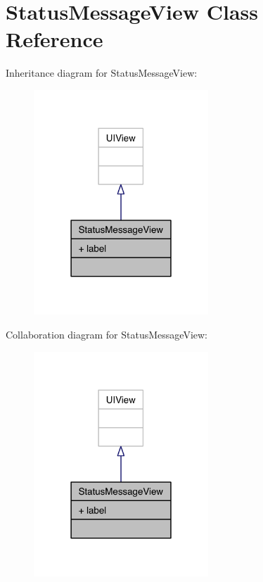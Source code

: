 \hypertarget{interface_status_message_view}{\section{Status\-Message\-View Class Reference}
\label{interface_status_message_view}
}


Inheritance diagram for Status\-Message\-View\-:\nopagebreak
\begin{figure}[H]
\begin{center}
\leavevmode
\includegraphics[width=186pt]{interface_status_message_view__inherit__graph}
\end{center}
\end{figure}


Collaboration diagram for Status\-Message\-View\-:\nopagebreak
\begin{figure}[H]
\begin{center}
\leavevmode
\includegraphics[width=186pt]{interface_status_message_view__coll__graph}
\end{center}
\end{figure}
